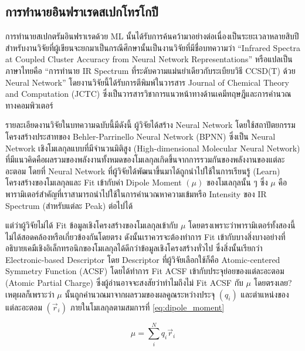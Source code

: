 \subsection{การทำนายอินฟราเรดสเปกโทรโกปี}
\label{ssec:pred_spec_ir}

การทำนายสเปกตรัมอินฟราเรดด้วย ML นั้นได้รับการค้นคว้ามาอย่างต่อเนื่องเป็นระยะเวลาหลายสิบปี\autocite{gastegger2017} สำหรับงานวิจัยที่ผู้เขียนจะยกมาเป็นกรณีศึกษานั้นเป็นงานวิจัยที่มีชื่อบทความว่า \enquote{Infrared Spectra at Coupled Cluster Accuracy from Neural Network Representations} หรือแปลเป็นภาษาไทยคือ \enquote{การทำนาย IR Spectrum ที่ระดับความแม่นยำเดียวกับระเบียบวิธี CCSD(T) ด้วย Neural Network}\autocite{beckmann2022} โดยงานวิจัยนี้ได้รับการตีพิมพ์ในวารสาร Journal of Chemical Theory and Computation (JCTC) ซึ่งเป็นวารสารวิชาการแนวหน้าทางด้านเคมีทฤษฎีและการคำนวณทางคอมพิวเตอร์

รายละเอียดงานวิจัยในบทความฉบับนี้มีดังนี้ ผู้วิจัยได้สร้าง Neural Network โดยใช้สถาปัตยกรรมโครงสร้างประสาทของ Behler-Parrinello Neural Network (BPNN)\autocite{behler2007,behler2011b,behler2015} ซึ่งเป็น Neural Network เชิงโมเลกุลแบบที่มีจำนวนมิติสูง (High-dimensional Molecular Neural Network) ที่มีแนวคิดคือผลรวมของพลังงานทั้งหมดของโมเลกุลเกิดขึ้นจากการรวมกันของพลังงานของแต่ละอะตอม โดยที่ Neural Network ที่ผู้วิจัยได้พัฒนาขึ้นมาได้ถูกนำไปใช้ในการเรียนรู้ (Learn) โครงสร้างของโมเลกุลและ Fit เข้ากับค่า Dipole Moment $(\mu)$ ของโมเลกุลนั้น ๆ ซึ่ง $\mu$ คือพารามิเตอร์สำคัญที่เราสามารถนำไปใช้ในการคำนวณหาความเข้มหรือ Intensity ของ IR Spectrum (สำหรับแต่ละ Peak) ต่อไปได้

แต่ว่าผู้วิจัยไม่ได้ Fit ข้อมูลเชิงโครงสร้างของโมเลกุลเข้ากับ $\mu$ โดยตรงเพราะว่าพารามิเตอร์ทั้งสองนี้ไม่ได้สอดคล้องหรือเกี่ยวข้องกันโดยตรง ดังนั้นเราควรจะต้องทำการ Fit เข้ากับบางสิ่งบางอย่างที่อธิบายเคมีเชิงอิเล็กทรอนิกของโมเลกุลได้ดีกว่าข้อมูลเชิงโครงสร้างทั่วไป ซึ่งสิ่งนั้นเรียกว่า Electronic-based Descriptor โดย Descriptor ที่ผู้วิจัยเลือกใช้ก็คือ Atomic-centered Symmetry Function (ACSF) โดยได้ทำการ Fit ACSF เข้ากับประจุย่อยของแต่ละอะตอม (Atomic Partial Charge) ซึ่งผู้อ่านอาจจะสงสัยว่าทำไมถึงไม่ Fit ACSF กับ $\mu$ โดยตรงเลย? เหตุผลก็เพราะว่า $\mu$ นั้นถูกคำนวณมาจากผลรวมของผลคูณระหว่างประจุ $(q_{i})$ และตำแหน่งของแต่ละอะตอม $(\vec{r}_{i})$ ภายในโมเลกุลตามสมการที่ \eqref{eq:dipole_moment}

\begin{equation}\label{eq:dipole_moment}
    \mu 
    = 
    \sum^{N}_{i} q_{i}\vec{r}_{i}
\end{equation}


